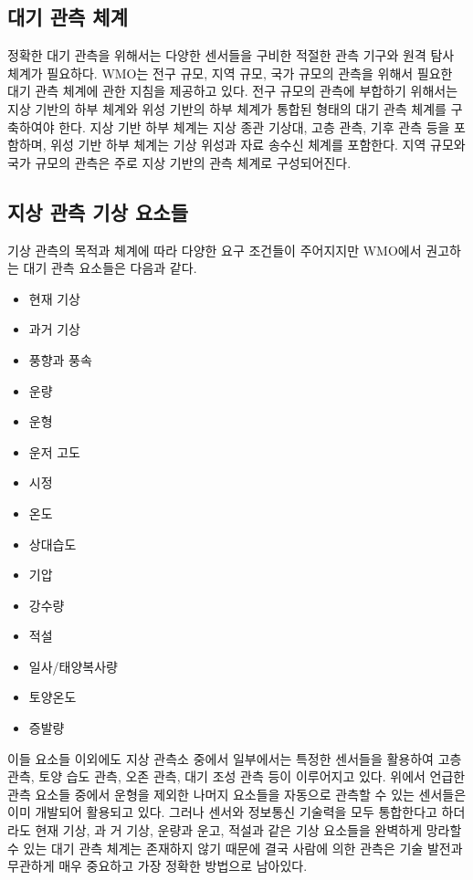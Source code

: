\subsection{대기 관측 체계}

정확한 대기 관측을 위해서는 다양한 센서들을 구비한 적절한 관측 기구와 원격 탐사 체계가 필요하다. WMO는 전구 규모, 지역 규모, 국가 규모의 관측을 위해서 필요한 대기 관측  체계에 관한 지침을 제공하고 있다. 전구 규모의 관측에 부합하기 위해서는 지상 기반의 하부 체계와 위성 기반의 하부 체계가 통합된 형태의 대기 관측 체계를 구축하여야 한다. 지상 기반 하부 체계는 지상 종관 기상대, 고층 관측, 기후 관측 등을 포함하며, 위성 기반 하부 체계는 기상 위성과 자료 송수신 체계를 포함한다. 지역 규모와 국가 규모의 관측은 주로 지상 기반의 관측 체계로 구성되어진다. 

\subsection{지상 관측 기상 요소들}

기상 관측의 목적과 체계에 따라 다양한 요구 조건들이 주어지지만 WMO에서 권고하는 대기 관측 요소들은 다음과 같다.

\begin{itemize}
	\item 현재 기상
	\item 과거 기상
	\item 풍향과 풍속
	\item 운량
	\item 운형
	\item 운저 고도
	\item 시정
	\item 온도
	\item 상대습도
	\item 기압
	\item 강수량
	\item 적설
	\item 일사/태양복사량
	\item 토양온도
	\item 증발량
\end{itemize}

이들 요소들 이외에도 지상 관측소 중에서 일부에서는 특정한 센서들을 활용하여 고층 관측, 토양 습도 관측, 오존 관측, 대기 조성 관측 등이 이루어지고 있다. 위에서 언급한 관측 요소들 중에서 운형을 제외한 나머지 요소들을 자동으로 관측할 수 있는 센서들은 이미 개발되어 활용되고 있다. 그러나 센서와 정보통신 기술력을 모두 통합한다고 하더라도 현재 기상, 과
거 기상, 운량과 운고, 적설과 같은 기상 요소들을 완벽하게 망라할 수 있는 대기 관측 체계는 존재하지 않기 때문에 결국 사람에 의한 관측은 기술 발전과 무관하게 매우 중요하고 가장 정확한 방법으로 남아있다.

